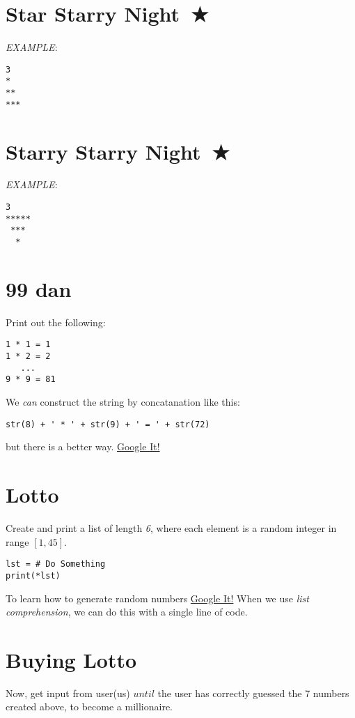 \documentclass{article}
\begin{document}
\thispagestyle{fancy}
\setcounter{section}{-1}

\section{Star Starry Night~★}
\textit{EXAMPLE}:
\begin{lstlisting}
3
*
**
***
\end{lstlisting}

\section{Starry Starry Night~★}
\textit{EXAMPLE}:
\begin{lstlisting}
3
*****
 ***
  *
\end{lstlisting}

\section{99 dan}
Print out the following:
\begin{lstlisting}
1 * 1 = 1
1 * 2 = 2
   ...
9 * 9 = 81
\end{lstlisting}
We \textit{can} construct the string by concatanation like this:
\begin{lstlisting}
str(8) + ' * ' + str(9) + ' = ' + str(72)
\end{lstlisting}
but there is a better way.
\href{https://www.google.com/search?q=python+string+format}{Google It!}

\section{Lotto}
Create and print a list of length \textit{6}, where each element is a random
integer in range $[1, 45]$.

\begin{lstlisting}
lst = # Do Something
print(*lst)
\end{lstlisting}

To learn how to generate random numbers
\href{https://www.google.com/search?q=python+random+number}{Google It!}
When we use \textit{list comprehension}, we can do this with a single line of code.


\section{Buying Lotto}
Now, get input from user(us) $until$ the user has correctly guessed the 7 numbers
created above, to become a millionaire.\\
\end{document}
